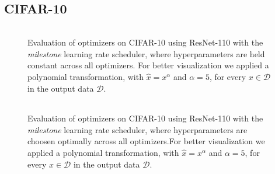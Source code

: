 \subsection{CIFAR-10}
\begin{figure}[h!]
    \centering
    \begin{tabular}{cc}
         \\ %
    \end{tabular}
    \caption{Evaluation of optimizers on CIFAR-10 using ResNet-110 with the \emph{milestone} learning rate scheduler, where hyperparameters
    are held constant across all optimizers. For better visualization we applied a polynomial transformation, with $\hat{x}=x^\alpha$ and $\alpha=5$, for every $x \in \mathcal{D}$ in the output data $ \mathcal{D}$.}
    \label{fig:cifar-10-milestone-real}
\end{figure}

\begin{figure}[h!]
    \centering
    \begin{tabular}{cc}
         \\ %
    \end{tabular}
    \caption{Evaluation of optimizers on CIFAR-10 using ResNet-110 with the \emph{milestone} learning rate scheduler, where hyperparameters
    are choosen optimally across all optimizers.For better visualization we applied a polynomial transformation, with $\hat{x}=x^\alpha$ and $\alpha=5$, for every $x \in \mathcal{D}$ in the output data $ \mathcal{D}$.
    }
    \label{fig:cifar-10-milestone-second-best}
\end{figure}

